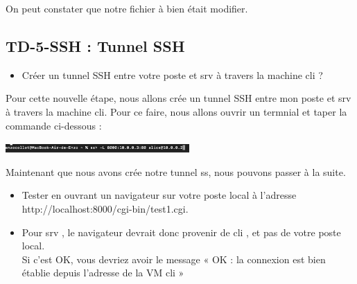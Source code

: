 \documentclass[12pt]{article}
\begin{document}
\vspace{0.3cm}

On peut constater que notre fichier à bien était modifier.

\newpage

\subsection{TD-5-SSH : Tunnel SSH}

\vspace{0.3cm}

\begin{itemize}
  \item Créer un tunnel SSH entre votre poste et srv à travers la machine cli ?
\end{itemize}

\vspace{0.3cm}

Pour cette nouvelle étape, nous allons crée un tunnel SSH entre mon poste et srv à travers la machine cli. Pour ce faire, nous allons ouvrir un termnial et taper la commande ci-dessous : 

\vspace{0.3cm}

\begin{center}
  \includegraphics[width=7cm]{Image-TD-SSH-5/port-local.png}
\end{center}

\vspace{0.3cm}

Maintenant que nous avons crée notre tunnel ss, nous pouvons passer à la suite.

\vspace{0.3cm}

\begin{itemize}
  \item Tester en ouvrant un navigateur sur votre poste local à l'adresse http://localhost:8000/cgi-bin/test1.cgi.
\end{itemize}

\vspace{0.3cm}

\begin{itemize}
  \item Pour srv , le navigateur devrait donc provenir de cli , et pas de votre poste local. \\
  Si c'est OK, vous devriez avoir le message « OK : la connexion est bien établie depuis l’adresse de la VM cli »
\end{itemize}
\end{document}
